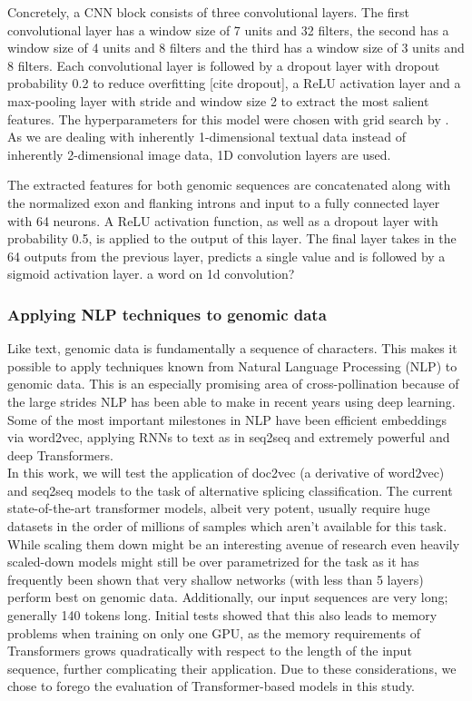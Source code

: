 Concretely, a CNN block consists of three convolutional layers. The first convolutional layer has a window size of 7 units and 32 filters, the second has a window size of 4 units and 8 filters and the third has a window size of 3 units and 8 filters. Each convolutional layer is followed by a dropout layer with dropout probability 0.2 to reduce overfitting [cite dropout], a ReLU activation layer and a max-pooling layer with stride and window size 2 to extract the most salient features. The hyperparameters for this model were chosen with grid search by \cite{dsc}. As we are dealing with inherently 1-dimensional textual data instead of inherently 2-dimensional image data, 1D convolution layers are used.




The extracted features for both genomic sequences are concatenated along with the normalized exon and flanking introns and input to a fully connected layer with 64 neurons. A ReLU activation function, as well as a dropout layer with probability 0.5, is applied to the output of this layer. The final layer takes in the 64 outputs from the previous layer, predicts a single value and is followed by a sigmoid activation layer.
a word on 1d convolution?
\subsubsection{Applying NLP techniques to genomic data}
Like text, genomic data is fundamentally a sequence of characters.
This makes it possible to apply techniques known from Natural Language Processing (NLP) to genomic data. This is an especially promising area of cross-pollination because of the large strides NLP has been able to make in recent years using deep learning.
Some of the most important milestones in NLP have been efficient embeddings via word2vec, applying RNNs to text as in seq2seq and extremely powerful and deep Transformers.\\
In this work, we will test the application of doc2vec (a derivative of word2vec) and seq2seq models to the task of alternative splicing classification. The current state-of-the-art transformer models, albeit very potent, usually require huge datasets in the order of millions of samples which aren't available for this task. While scaling them down might be an interesting avenue of research even heavily scaled-down models might still be over parametrized for the task as it has frequently been shown that very shallow networks (with less than 5 layers) perform best on genomic data. Additionally, our input sequences are very long; generally 140 tokens long. Initial tests showed that this also leads to memory problems when training on only one GPU, as the memory requirements of Transformers grows quadratically with respect to the length of the input sequence, further complicating their application. Due to these considerations, we chose to forego the evaluation of Transformer-based models in this study.
